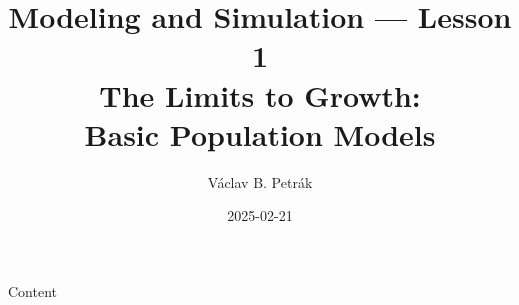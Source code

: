 \documentclass[11pt]{beamer}
\title{Modeling and Simulation --- Lesson 1\\
\textbf{The Limits to Growth:\\
Basic Population Models}}
\author{Václav B. Petrák}
\institute{Faculty of Biomedical Engineering\\
Czech Technical University}
\date{2025-02-21}
\begin{document}
\begin{frame}
  \titlepage
\end{frame}

\begin{frame}{Content}
    \tableofcontents 
\end{frame}

 
 
 

\end{document}
